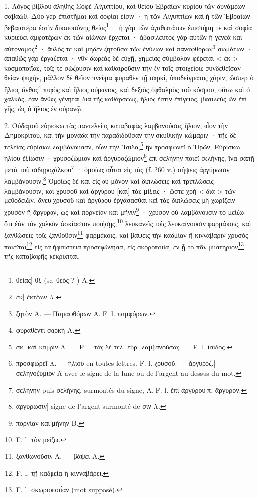 \documentclass[a4paper, 11pt, oneside, polutonikogreek, french]{article}
\begin{document}
\bigskip

1. Λόγος βίβλου ἀληθὴς Σοφὲ Αἰγυπτίου, καὶ θείου Ἑβραίων κυρίου τῶν δυνάμεων σαβαώθ. Δύο γὰρ ἐπιστῆμαι καὶ σοφίαι εἰσίν · ἡ τῶν Αἰγυπτίων καὶ ἡ τῶν Ἑβραίων βεβαιοτέρα ἐστὶν δικαιοσύνης θείας\footnote{θείας] θξ (sc. θεὸς ? ) A.} · ἡ γὰρ τῶν ἀγαθωτάτων ἐπιστήμη τε καὶ σοφία κυριεύει ἀμφοτέρων ἐκ τῶν αἰώνων ἔρχεται · ἀβασίλευτος γὰρ αὐτῶν ἡ γενεὰ καὶ αὐτόνομος\footnote{ἐκ] ἐκτέων A.} · ἄϋλός τε καὶ μηδὲν ζητοῦσα τῶν ἐνύλων καὶ παναφθόρων\footnote{ζητὸν A. --- Παμαφθόρων A. F. l. παμφόρων.} σωμάτων · ἀπαθῶς γὰρ ἐργάζεται · νῦν δωρεὰς δὲ εὐχῇ, χημείας σύμβολον φέρεται < ἐκ > κοσμοποιΐας, τοῖς τε σώζουσιν καὶ καθαιροῦσιν τὴν ἐν τοῖς στοιχείοις συνδεθεῖσαν θείαν ψυχὴν, μᾶλλον δὲ θεῖον πνεῦμα φυραθὲν τῇ σαρκὶ, ὑποδείγματος χάριν, ὥσπερ ὁ ἥλιος ἄνθος\footnote{φυραθέντι σαρκὴ A.} πυρὸς καὶ ἥλιος οὐράνιος, καὶ δεξιὸς ὀφθαλμὸς τοῦ κόσμου, οὕτω καὶ ὁ χαλκὸς, ἐὰν ἄνθος γένηται διὰ τῆς καθάρσεως, ἥλιός ἐστιν ἐπίγειος, βασιλεὺς ὢν ἐπὶ γῆς, ὡς ὁ ἥλιος ἐν οὐρανῷ.

2. Οὐδαμοῦ εὑρίσκω τὰς παντελείας καταβαφὰς λαμβανούσας ἥλιον, οἷον τὴν Δημοκρίτου, καὶ τὴν μονάδα τὴν παραδιδοῦσαν τὴν σκυθικὴν κώμαριν · τῆς δὲ τελείας εὑρίσκω λαμβάνουσαν, οἷον τὴν Ἴσιδα,\footnote{σκ. καὶ καμρὶν A. --- F. l. τὰς δὲ τελ. εὑρ. λαμβανούσας. --- F. l. ἴσιδος.} ἣν προσφωνεῖ ὁ Ἡρῶν. Εὑρίσκω ἡλίου ἐξίωσιν · χρυσοζώμιον καὶ ἀργυροζώμιον\footnote{προσφωρεῖ A. --- ἡλίου en toutes lettres. F. l. χρυσοῦ. --- ἀργυροζ.] σεληνοζύμιον A avec le signe de la lune ou de l'argent au-dessus du mot.} ἐπὶ σελήνην ποιεῖ σελήνης, ἵνα σαπῇ μετὰ τοῦ σιδηροχάλκου\footnote{σελήνην puis σελήνης, surmontés du signe, A. F. l. ἐπὶ ἀργύρου π. ἄργυρον.} · ὁμοίως αὗται εἰς τὰς (f. 260 v.) σήψεις ἀργύρωσιν λαμβάνουσιν.\footnote{ἀργύρωσιν] signe de l'argent surmonté de σιν A.} Ὁμοίως δὲ καὶ εἰς οὐ μόνον καὶ διπλώσεις καὶ τριπλώσεις λαμβάνουσιν, καὶ χρυσοῦ καὶ ἀργύρου [καὶ] τὰς μίξεις · ὥστε χρὴ < διὰ > τῶν μεθοδειῶν, ἄνευ χρυσοῦ καὶ ἀργύρου ἐργάσασθαι καὶ τὰς διπλώσεις μὴ χωρίζειν χρυσὸν ἢ ἄργυρον, ὡς καὶ πορνείαν καὶ μῆνιν\footnote{πορνίαν καὶ μήνην B.} · χρυσὸν οὐ λαμβάνουσιν τὸ μείζω ὅτι ἐὰν τὸν χαλκὸν ἀσκίαστον ποιήσῃς,\footnote{F. l. τὸν μείζω.} λευκανεῖς τοῖς λευκαίνουσιν φαρμάκοις, καὶ ξανθώσεις τοῖς ξανθοῦσιν\footnote{ξανθωνοῦσιν A. --- βάψει A.} φαρμάκοις, καὶ βάψεις τὴν καδμίαν ἢ κιννάβαριν χρυσὸς ποιεῖται\footnote{F. l. τῇ καδμείᾳ ἢ κινναβάρει.} εἰς τὰ ἡφαίστεια προσεφώνησα, εἰς σκοροποιία, ἐν ᾗ τὸ πᾶν μυστήριον\footnote{F. l. σκωριοποιΐαν (mot supposé).} τῆς καταβαφῆς κέκρυπται.
\end{document}
